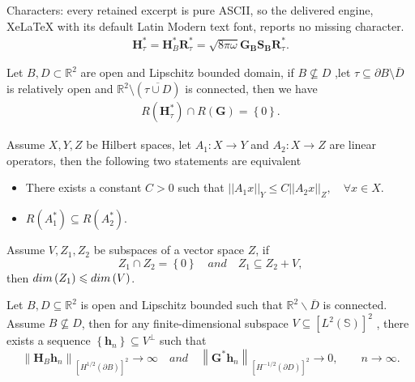 \documentclass[10pt,a4paper]{amsart}
\begin{document}
Characters: every retained excerpt is pure ASCII, so the delivered engine, XeLaTeX with its default Latin Modern text font, reports no missing character.
	\begin{align}\label{eq:RestriH}
		\mathbf H^*_{\tau}=\mathbf H^*_B \mathbf R^*_{\tau}=\sqrt{8\pi\omega}\mathbf{G_B S_B}  \mathbf R^*_{\tau}.
	\end{align}

	\begin{thm}\label{RangeHG}
		Let $B, D \subset \mathbb R^2$ are open and Lipschitz bounded domain, if $B \nsubseteq D$ ,let $\tau \subseteq \partial B \setminus \overline{D} $ is relatively open and $\mathbb R^2 \setminus \left( \overline{\tau \cup D }\right) $ is connected, then we have
			\begin{align}
				R\left( \mathbf H^*_{\tau} \right) \cap R\left( \mathbf G\right) =\left\lbrace 0\right\rbrace .
			\end{align}
	\end{thm}

\begin{lem}\label{Inquallity}%
	Assume $X, Y, Z$ be Hilbert spaces, let $A_1:X \to Y$ and $A_2: X \to Z$ are linear operators, then the following two statements are equivalent
	\begin{itemize}
		\item [(1).] There exists a constant $C>0$ such that $||A_1 x||_Y \leq C ||A_2 x||_Z, \quad \forall x \in X$.
		\item [(2).] $R \left( A^*_1 \right) \subseteq R \left( A^*_2 \right) $.
	\end{itemize}
\end{lem}

\begin{lem}\label{Dim}%
	Assume $V, Z_1, Z_2 $ be subspaces of a vector space $Z$, if 
	$$
	Z_1 \cap Z_2= \left\lbrace 0 \right\rbrace \quad and \quad Z_1 \subseteq Z_2 +V,
	$$
	then $\rm {dim}\left(  Z_1 \right) \leqslant \rm {dim}\left(  V \right) $.
\end{lem}

\begin{thm}\label{LocialWaveFounc}
 Let $B, D  \subseteq \mathbb R^2$ is open and Lipschitz bounded such that $\mathbb R^2 \backslash \overline {D}$ is connected. Assume $B \nsubseteq D$, then for any finite-dimensional subspace $V \subseteq \left[L^{2}\left(\mathbb S\right) \right] ^2 $ , there exists a sequence $\left\lbrace  \mathbf h_n \right\rbrace  \subseteq  V^{\perp} $ such that
 $$
 \left\|\mathbf H_B \mathbf h_n\right\|_{\left[H^{1/2}\left(\partial B\right) \right] ^2 } \to \infty \quad and \quad \left\| \mathbf G^* \mathbf h_n\right\|_{\left[H^{-1/2}\left(\partial D\right) \right] ^2 } \to 0, \qquad n\to \infty.
 $$
\end{thm}
\end{document}
